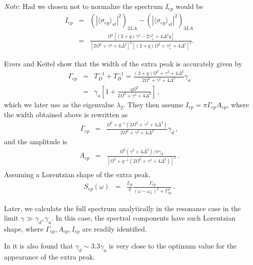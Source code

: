 \documentclass[twocolumn,aps,eqsecnum,showkeys,amsmath]{revtex4-2}
\begin{document}
\textit{Note}: Had we chosen not to normalize the spectrum $I_{ep}$ 
would be 
%
\begin{eqnarray} 	\label{eq:I_narrowpeak}
I_{ep} &=& \left( |\langle \sigma_{eg} \rangle_{st} |^2 \right)_{2LA}
	- \left( |\langle \sigma_{eg} \rangle_{st} |^2 \right)_{3LA} 	\nonumber \\ 
&=& \frac{ \Omega^4 [(2+q) \gamma^2 -2\gamma_+^2 +4\Delta^2 q ]}
	{[2\Omega^2 +\gamma^2 +4\Delta^2 ]^2
	[(2+q)\Omega^2 +\gamma_+^2 +4\Delta^2 ]^2 }  . \nonumber 	
\end{eqnarray}

Evers and Keitel \cite{EvKe02} show that the width of the extra peak is 
accurately given by 
%
\begin{eqnarray} 	\label{eq:widthextra}
\Gamma_{ep} &=& T_D^{-1} +T_B^{-1} 	
	= \frac{ (2+q)\Omega^2 +\gamma^2 +4\Delta^2 }
	{2\Omega^2 +\gamma^2 +4\Delta^2} \gamma_a 	\nonumber \\ 
&=& \gamma_a \left[ 1+ \frac{ q\Omega^2 }
	{2\Omega^2 +\gamma^2 +4\Delta^2}  \right] 	\,, 
\end{eqnarray}
which we later use as the eigenvalue $\lambda_2$. They then assume 
$I_{ep} =\pi \Gamma_{ep} A_{ep}$, where the width obtained above is 
rewritten as 
%
\begin{eqnarray}
\Gamma_{ep} &=& 
	\frac{ \Omega^2 +q^{-1}(2\Omega^2 +\gamma^2 +4\Delta^2)}
	{2\Omega^2 +\gamma^2 +4\Delta^2} \gamma_d 	\,, 	 
\end{eqnarray}
and the amplitude is 
%
\begin{eqnarray}
A_{ep} &=& \frac{ \Omega^2 ( \gamma^2 +4\Delta^2 )/\pi \gamma_d }
	{ [ \Omega^2 +q^{-1}(2\Omega^2 +\gamma^2 +4\Delta^2) ]^2 }  \,. 	
	\nonumber \\
\end{eqnarray}
Assuming a Lorentzian shape of the extra peak, 
%
\begin{eqnarray}
S_{ep}(\omega) &=& \frac{I_{ep}}{\pi} \frac{\Gamma_{ep}}
	{(\omega -\omega_L)^2 +\Gamma_{ep}^2} 	\,.
\end{eqnarray}

Later, we calculate the full spectrum analytically in the resonance case in
the limit $\gamma \gg \gamma_d, \gamma_a$. In this case, the spectral 
components have such Lorentzian shape, where 
$\Gamma_{ep}, A_{ep},I_{ep}$ are readily identified.  

In \cite{EvKe02} it is also found that $\gamma_d \sim 3.3 \gamma_a$ 
is very close to the optimum value for the appearance of the extra peak. 
\end{document}
